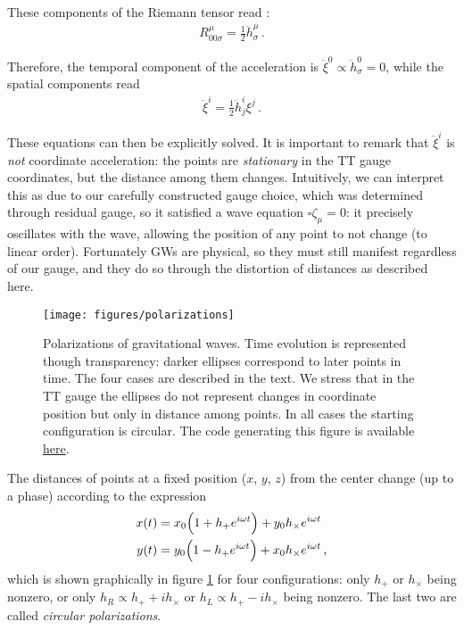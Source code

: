 \documentclass[main.tex]{subfiles}
\begin{document}
These components of the Riemann tensor read \cite[eq.\ 7.106]{carrollSpacetimeGeometryIntroduction2019}: 
%
\begin{align}
R^{\mu }_{00 \sigma } = \frac{1}{2} \ddot{h}^{\mu }_{\sigma }
\,.
\end{align}

Therefore, the temporal component of the acceleration is \(\ddot{\xi}^{0} \propto \ddot{h}^{0}_{\sigma } = 0 \), while the spatial components read 
%
\begin{align} \label{eq:tidal-acceleration-TT-gauge}
\ddot{\xi}
^{i} = \frac{1}{2} \ddot{h}^{i}_{j} \xi^{j}
\,.
\end{align}

These equations can then be explicitly solved.
It is important to remark that \(\ddot{\xi }^{i}\) is \emph{not} coordinate acceleration: the points are \emph{stationary} in the \ac{TT} gauge coordinates, but the distance among them changes.
Intuitively, we can interpret this as due to our carefully constructed gauge choice, which was determined through residual gauge, so it satisfied a wave equation \(\square \zeta _\mu =0 \): it precisely oscillates with the wave, allowing the position of any point to not change (to linear order). 
Fortunately \acsp{GW} are physical, so they must still manifest regardless of our gauge, and they do so through the distortion of distances as described here.

\begin{figure}[ht]
\centering
\texttt{[image: figures/polarizations]}
\caption{Polarizations of gravitational waves. Time evolution is represented though transparency: darker ellipses correspond to later points in time. The four cases are described in the text. We stress that in the \ac{TT} gauge the ellipses do not represent changes in coordinate position but only in distance among points. In all cases the starting configuration is circular. The code generating this figure is available \href{https://github.com/jacopok/master-thesis/blob/main/thesis/figures/polarizations.py}{here}.}
\label{fig:polarizations}
\end{figure}

The distances of points at a fixed position (\(x\), \(y\), \(z\)) from the center change (up to a phase) according to the expression 
%
\begin{subequations}
\begin{align}
x (t) &= x_{0} \qty(1 + h_+ e^{i \omega t}) + y_{0} h_\times  e^{i \omega t} \\
y (t) &= y_{0} \qty(1 - h_+ e^{i \omega t}) + x_{0} h_\times  e^{i \omega t} 
\,,
\end{align}
\end{subequations}
%
which is shown graphically in figure \ref{fig:polarizations} for four configurations: only \(h_+\) or \(h_\times \) being nonzero, or only \(h_R \propto h_+ + i h_\times \) or \(h_L \propto h_+ - i h_\times \) being nonzero. 
The last two are called \emph{circular polarizations}.
\end{document}
